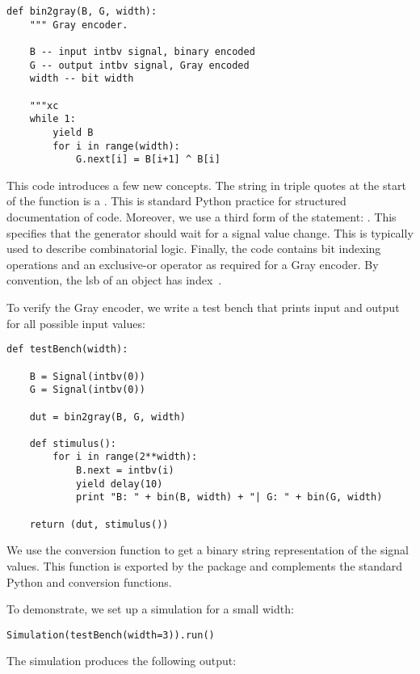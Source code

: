 \begin{verbatim}
def bin2gray(B, G, width):
    """ Gray encoder.

    B -- input intbv signal, binary encoded
    G -- output intbv signal, Gray encoded
    width -- bit width

    """xc
    while 1:
        yield B
        for i in range(width):
            G.next[i] = B[i+1] ^ B[i]
\end{verbatim}

This code introduces a few new concepts. The string in triple quotes
at the start of the function is a . This is standard
Python practice for structured documentation of code. Moreover, we
use a third form of the  statement:
. This specifies that the generator should
wait for a signal value change. This is typically used to
describe 
combinatorial logic.
Finally, the code contains bit indexing operations and an exclusive-or
operator as required for a Gray encoder. By convention, the lsb of an
 object has index~.

To verify the Gray encoder, we write a test bench that prints input
and output for all possible input values:

\begin{verbatim}
def testBench(width):
    
    B = Signal(intbv(0))
    G = Signal(intbv(0))
    
    dut = bin2gray(B, G, width)

    def stimulus():
        for i in range(2**width):
            B.next = intbv(i)
            yield delay(10)
            print "B: " + bin(B, width) + "| G: " + bin(G, width)

    return (dut, stimulus())
\end{verbatim}

We use the conversion function  to get a binary
string representation of the signal values. This function is exported
by the  package and complements the standard Python
 and  conversion functions.

To demonstrate, we set up a simulation for a small width: 

\begin{verbatim}
Simulation(testBench(width=3)).run()
\end{verbatim}

The simulation produces the following output:

